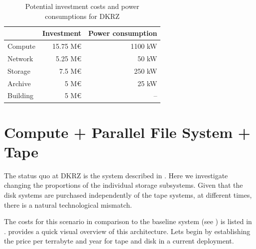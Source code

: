 \documentclass{../../template/esiwace-report}
\begin{document}
\begin{table}
\centering
\begin{tabular}{|l|r|r|}
	\hline
	         &   Investment & Power consumption \\ \hline
	Compute  & 15.75 M\euro &           1100 kW \\
	Network  &  5.25 M\euro &             50 kW \\
	Storage  &   7.5 M\euro &            250 kW \\
	Archive  &     5 M\euro &             25 kW \\
	Building &     5 M\euro &                -- \\ \hline
\end{tabular}
\caption{Potential investment costs and power consumptions for DKRZ}
\label{tbl:dkrz model costs}
\vspace*{-0.35cm}
\end{table}





%


\section{Compute + Parallel File System + Tape}
\label{sec:compute + pfs + tape}



The status quo at DKRZ is the system described in . Here we investigate changing
the proportions of the individual storage subsystems. Given that the disk systems are purchased independently
of the tape systems, at different times, there is a natural technological mismatch.

The costs for this scenario in comparison to the baseline system (see ) is listed in .
 provides a quick visual overview of this architecture.
Lets begin by establishing the price per terrabyte and year for tape and disk in a current deployment.
\end{document}
